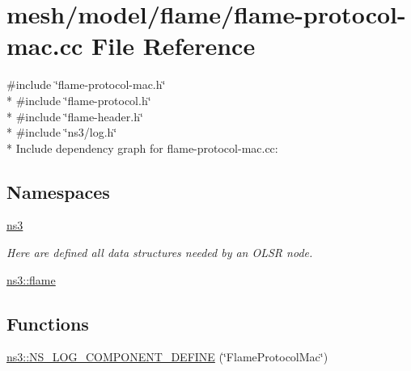 \hypertarget{flame-protocol-mac_8cc}{}\section{mesh/model/flame/flame-\/protocol-\/mac.cc File Reference}
\label{flame-protocol-mac_8cc}
{\ttfamily \#include \char`\"{}flame-\/protocol-\/mac.\+h\char`\"{}}\\*
{\ttfamily \#include \char`\"{}flame-\/protocol.\+h\char`\"{}}\\*
{\ttfamily \#include \char`\"{}flame-\/header.\+h\char`\"{}}\\*
{\ttfamily \#include \char`\"{}ns3/log.\+h\char`\"{}}\\*
Include dependency graph for flame-\/protocol-\/mac.cc\+:
\subsection*{Namespaces}
\begin{DoxyCompactItemize}
\item 
 \hyperlink{namespacens3}{ns3}
\begin{DoxyCompactList}\small\item\em Here are defined all data structures needed by an O\+L\+SR node. \end{DoxyCompactList}\item 
 \hyperlink{namespacens3_1_1flame}{ns3\+::flame}
\end{DoxyCompactItemize}
\subsection*{Functions}
\begin{DoxyCompactItemize}
\item 
\hyperlink{namespacens3_afd680a10d9ec3c557a7cd232bf9a7dc3}{ns3\+::\+N\+S\+\_\+\+L\+O\+G\+\_\+\+C\+O\+M\+P\+O\+N\+E\+N\+T\+\_\+\+D\+E\+F\+I\+NE} (\char`\"{}Flame\+Protocol\+Mac\char`\"{})
\end{DoxyCompactItemize}
